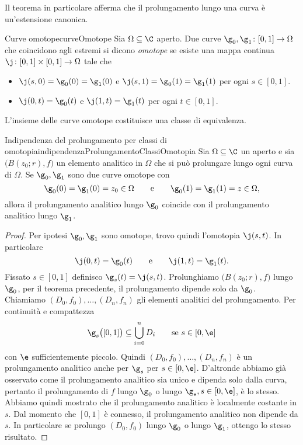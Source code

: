 \begin{oss}
	Il teorema in particolare afferma che il prolungamento lungo una curva è un'estensione canonica.
\end{oss}
%
%
\begin{defn}{Curve omotope}{curveOmotope}
	Sia \(\Omega\subseteq\C\) aperto. Due curve \(\g_0,\g_1\colon [0,1] \to \Omega\) che coincidono agli estremi si dicono \emph{omotope} se esiste una mappa continua \(\j\colon [0,1] \times [0,1] \to \Omega\) tale che
	\begin{itemize}
		\item \(\j(s,0)=\g_0(0)=\g_1(0)\) e \(\j(s,1)=\g_0(1)=\g_1(1)\) per ogni \(s\in[0,1]\).
		\item \(\j(0,t)=\g_0(t)\) e \(\j(1,t)=\g_1(t)\) per ogni \(t\in[0,1]\).
	\end{itemize}
\end{defn}

\begin{oss}
	L'insieme delle curve omotope costituisce una classe di equivalenza.
\end{oss}

\begin{teor}{Indipendenza del prolungamento per classi di omotopia}{indipendenzaProlungamentoClassiOmotopia}
	Sia \(\Omega\subseteq \C\) un aperto e sia \(\big(B(z_0;r),f\big)\) un elemento analitico in \(\Omega\) che si può prolungare lungo ogni curva di \(\Omega\). Se \(\g_0,\g_1\) sono due curve omotope con
	\[
		\g_0(0)=\g_1(0)=z_0\in\Omega \qquad\text{e}\qquad \g_0(1)=\g_1(1)=z\in\Omega,
	\]
	allora il prolungamento analitico lungo \(\g_0\) coincide con il prolungamento analitico lungo \(\g_1\).
\end{teor}

\begin{proof}
	Per ipotesi \(\g_0,\g_1\) sono omotope, trovo quindi l'omotopia \(\j(s,t)\). In particolare
	\[
		\j(0,t) = \g_0(t) \qquad\text{e}\qquad \j(1,t) = \g_1(t).
	\]
	Fissato \(s\in[0,1]\) definisco \(\g_s(t)=\j(s,t)\).
	Prolunghiamo \(\big(B(z_0;r),f\big)\) lungo \(\g_0\), per il teorema precedente, il prolungamento dipende solo da \(\g_0\).
	Chiamiamo \((D_0,f_0),\ldots,(D_n,f_n)\) gli elementi analitici del prolungamento. Per continuità e compattezza
	\[
		\g_s\big([0,1]\big) \subseteq \bigcup_{i=0}^n D_i \qquad\text{se }s\in[0,\e]
	\]
	con \(\e\) sufficientemente piccolo.
	Quindi \((D_0,f_0),\ldots,(D_n,f_n)\) è un prolungamento analitico anche per \(\g_s\) per \(s\in[0,\e]\).
	D'altronde abbiamo già osservato come il prolungamento analitico sia unico e dipenda solo dalla curva, pertanto il prolungamento di \(f\) lungo \(\g_0\) o lungo \(\g_s,s\in[0,\e]\), è lo stesso.
	Abbiamo quindi mostrato che il prolungamento analitico è localmente costante in \(s\). Dal momento che \([0,1]\) è connesso, il prolungamento analitico non dipende da \(s\). In particolare se prolungo \((D_0,f_0)\) lungo \(\g_0\) o lungo \(\g_1\), ottengo lo stesso risultato.
\end{proof}

